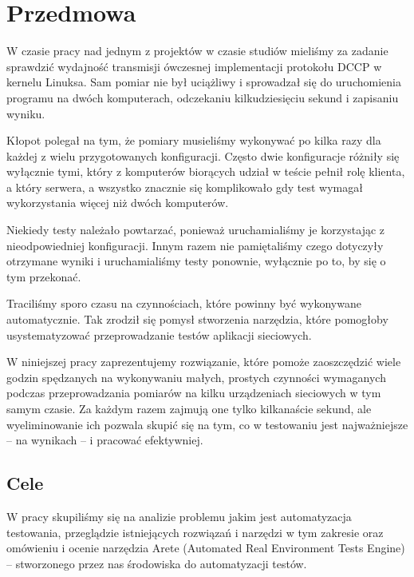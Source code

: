 \documentclass[00-praca-magisterska.tex]{subfiles}
\begin{document}
\chapter{Przedmowa}

W czasie pracy nad jednym z projektów w czasie studiów mieliśmy za zadanie
sprawdzić wydajność transmisji ówczesnej implementacji protokołu DCCP w kernelu
Linuksa.  Sam pomiar nie był uciążliwy i sprowadzał się do uruchomienia
programu na dwóch komputerach, odczekaniu kilkudziesięciu sekund i zapisaniu
wyniku.

Kłopot polegał na tym, że pomiary musieliśmy wykonywać po kilka razy dla
każdej z wielu przygotowanych konfiguracji. Często dwie konfiguracje różniły się
wyłącznie tymi, który z komputerów biorących udział w teście pełnił rolę klienta,
a który serwera, a wszystko znacznie się komplikowało gdy test wymagał
wykorzystania więcej niż dwóch komputerów.

Niekiedy testy należało powtarzać, ponieważ uruchamialiśmy je korzystając z
nieodpowiedniej konfiguracji. Innym razem nie pamiętaliśmy czego dotyczyły
otrzymane wyniki i uruchamialiśmy testy ponownie, wyłącznie po to, by się o tym
przekonać.

Traciliśmy sporo czasu na czynnościach, które powinny być wykonywane
automatycznie. Tak zrodził się pomysł stworzenia narzędzia, które
pomogłoby usystematyzować przeprowadzanie testów aplikacji sieciowych.


W niniejszej pracy zaprezentujemy rozwiązanie, które pomoże zaoszczędzić wiele
godzin spędzanych na wykonywaniu małych, prostych czynności wymaganych podczas
przeprowadzania pomiarów na kilku urządzeniach sieciowych w tym samym czasie.
Za każdym razem zajmują one tylko kilkanaście sekund, ale wyeliminowanie ich
pozwala skupić się na tym, co w testowaniu jest najważniejsze -- na wynikach --
i pracować efektywniej.

\section{Cele}

W pracy skupiliśmy się na analizie problemu jakim jest automatyzacja
testowania, przeglądzie istniejących rozwiązań i narzędzi w tym zakresie oraz
omówieniu i ocenie narzędzia Arete (Automated Real Environment Tests Engine) --
stworzonego przez nas środowiska do automatyzacji testów.
\end{document}
